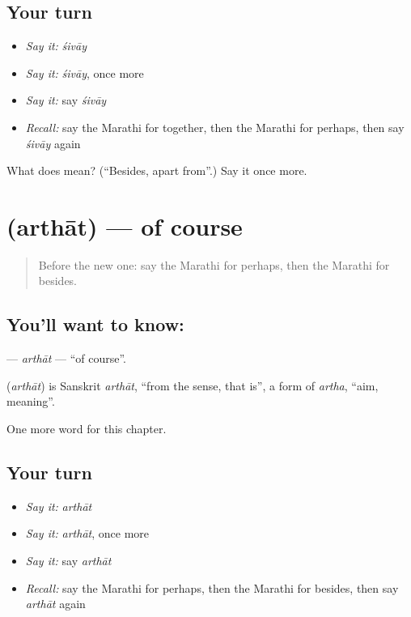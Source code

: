 \subsection*{Your turn}
\begin{itemize}
\raggedright
  \item \emph{Say it:} \emph{śivāy}
  \item \emph{Say it:} \emph{śivāy}, once more
  \item \emph{Say it:} say \emph{śivāy}
  \item \emph{Recall:} say the Marathi for together, then the Marathi for perhaps, then say \emph{śivāy} again
\end{itemize}

\begin{tcolorbox}[breakable,colback=teal!4,colframe=teal!35!black,title={Before you move on}]
What does  mean? (\textquotedblleft{}Besides, apart from\textquotedblright{}.) Say it once more.
\end{tcolorbox}
\section[\texorpdfstring{\mr{अर्थात} (arthāt)}{अर्थात (arthāt)}]{ (arthāt) — of course}

\label{lesson:MR-C231-arthat}



\begin{quote}
Before the new one: say the Marathi for perhaps, then the Marathi for besides.
\end{quote}

\subsection*{You'll want to know: }
\textbf{} — \emph{arthāt} — \textquotedblleft{}of course\textquotedblright{}.

\begin{cousinweb}
\textbf{} (\emph{arthāt}) is Sanskrit \emph{arthāt}, \textquotedblleft{}from the sense, that is\textquotedblright{}, a form of \emph{artha}, \textquotedblleft{}aim, meaning\textquotedblright{}.
\end{cousinweb}

\begin{grammarlens}[title={What you've built}]
One more word for this chapter.
\end{grammarlens}

\subsection*{Your turn}
\begin{itemize}
\raggedright
  \item \emph{Say it:} \emph{arthāt}
  \item \emph{Say it:} \emph{arthāt}, once more
  \item \emph{Say it:} say \emph{arthāt}
  \item \emph{Recall:} say the Marathi for perhaps, then the Marathi for besides, then say \emph{arthāt} again
\end{itemize}


